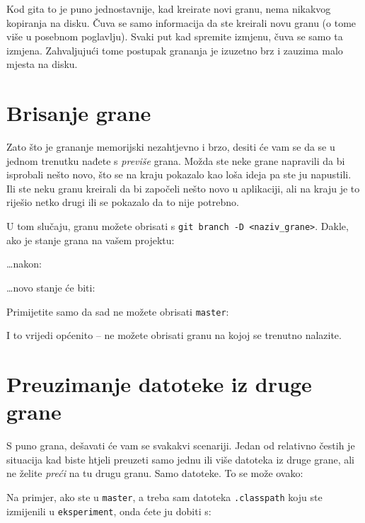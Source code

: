 Kod gita to je puno jednostavnije, kad kreirate novi granu, nema nikakvog kopiranja na disku. 
Čuva se samo informacija da ste kreirali novu granu (o tome više u posebnom poglavlju).
Svaki put kad spremite izmjenu, čuva se samo ta izmjena.
Zahvaljujući tome postupak grananja je izuzetno brz i zauzima malo mjesta na disku.

\section*{Brisanje grane}

Zato što je grananje memorijski nezahtjevno i brzo, desiti će vam se da se u jednom trenutku nađete s \emph{previše} grana.
Možda ste neke grane napravili da bi isprobali nešto novo, što se na kraju pokazalo kao loša ideja pa ste ju napustili.
Ili ste neku granu kreirali da bi započeli nešto novo u aplikaciji, ali na kraju je to riješio netko drugi ili se pokazalo da to nije potrebno.

U tom slučaju, granu možete obrisati s \verb+git branch -D <naziv_grane>+. 
Dakle, ako je stanje grana na vašem projektu:



\dots{}nakon:



\dots{}novo stanje će biti:



Primijetite samo da sad ne možete obrisati \verb+master+:



I to vrijedi općenito -- ne možete obrisati granu na kojoj se trenutno nalazite.

\section*{Preuzimanje datoteke iz druge grane}

S puno grana, dešavati će vam se svakakvi scenariji.
Jedan od relativno čestih je situacija kad biste htjeli preuzeti samo jednu ili više datoteka iz druge grane, ali ne želite \emph{preći} na tu drugu granu.
Samo datoteke.
To se može ovako:


Na primjer, ako ste u \verb+master+, a treba sam datoteka \verb+.classpath+ koju ste izmijenili u \verb+eksperiment+, onda ćete ju dobiti s:

